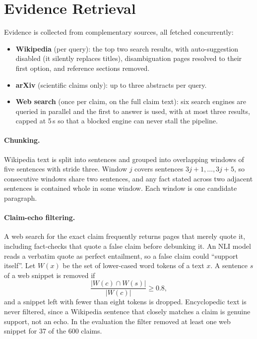 \section{Evidence Retrieval}
\label{sec:retrieval}

Evidence is collected from complementary sources, all fetched concurrently:
\begin{itemize}[itemsep=0.2em]
  \item \textbf{Wikipedia} (per query): the top two search results, with auto-suggestion disabled (it silently replaces titles), disambiguation pages resolved to their first option, and reference sections removed.
  \item \textbf{arXiv} (scientific claims only): up to three abstracts per query.
  \item \textbf{Web search} (once per claim, on the full claim text): six search engines are queried in parallel and the first to answer is used, with at most three results, capped at 5\,s so that a blocked engine can never stall the pipeline.
\end{itemize}

\paragraph{Chunking.} Wikipedia text is split into sentences and grouped into overlapping windows of five sentences with stride three. Window $j$ covers sentences $3j+1, \dots, 3j+5$, so consecutive windows share two sentences, and any fact stated across two adjacent sentences is contained whole in some window. Each window is one candidate paragraph.

\paragraph{Claim-echo filtering.} A web search for the exact claim frequently returns pages that merely quote it, including fact-checks that quote a false claim before debunking it. An NLI model reads a verbatim quote as perfect entailment, so a false claim could ``support itself''. Let $W(x)$ be the set of lower-cased word tokens of a text $x$. A sentence $s$ of a web snippet is removed if
\begin{equation}
  \frac{\lvert W(c) \cap W(s) \rvert}{\lvert W(c) \rvert} \ge 0.8,
\end{equation}
and a snippet left with fewer than eight tokens is dropped. Encyclopedic text is never filtered, since a Wikipedia sentence that closely matches a claim is genuine support, not an echo. In the evaluation the filter removed at least one web snippet for 37 of the 600 claims.

